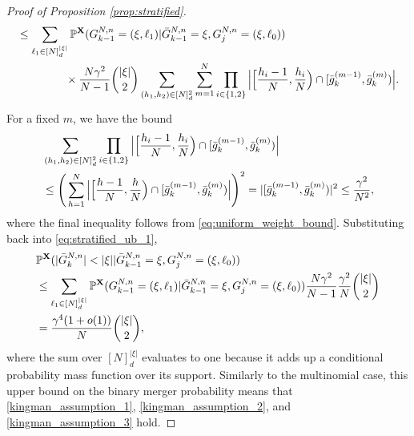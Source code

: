 \documentclass[a4paper,11pt]{article}
\theoremstyle{definition}
\newcommand{\bbP}{\mathbb{P}}
\newcommand{\bfX}{\mathbf{X}}
\begin{document}
\begin{proof}[Proof of Proposition \ref{prop:stratified}]
\begin{align}
&\leq \sum_{ \ell_1 \in [ N ]_d^{ | \xi | } } \bbP^{ \bfX }( G_{ k - 1 }^{ N, n } = ( \xi, \ell_1 ) | \bar{ G }_{ k - 1 }^{ N, n } = \xi, G_j^{ N, n } = ( \xi, \ell_0 ) ) \notag \\
&\phantom{ \leq \sum_{ \ell_1 \in [ N ]_d^{ | \xi | } } } \times \frac{ N \gamma^2 }{ N - 1 } \binom{ | \xi | }{ 2 } \sum_{ ( h_1, h_2 ) \in [ N ]_d^2 } \sum_{ m = 1 }^N \prod_{ i \in \{ 1, 2 \} } \Big| \Big[ \frac{ h_i - 1 }{ N }, \frac{ h_i }{ N } \Big) \cap [ \bar{ g }_k^{ ( m - 1 ) }, \bar{ g }_k^{ ( m ) } ) \Big|. \label{eq:stratified_ub_1}
\end{align}
For a fixed $m$, we have the bound
\begin{align}
&\sum_{ ( h_1, h_2 ) \in [ N ]_d^2 } \prod_{ i \in \{ 1, 2 \} } \Big| \Big[ \frac{ h_i - 1 }{ N }, \frac{ h_i }{ N } \Big) \cap [ \bar{ g }_k^{ ( m - 1 ) }, \bar{ g }_k^{ ( m ) } ) \Big| \notag \\
&\leq \Bigg( \sum_{ h = 1 }^N \Big| \Big[ \frac{ h - 1 }{ N }, \frac{ h }{ N } \Big) \cap [ \bar{ g }_k^{ ( m - 1 ) }, \bar{ g }_k^{ ( m ) } ) \Big| \Bigg)^2 = | [ \bar{ g }_k^{ ( m - 1 ) }, \bar{ g }_k^{ ( m ) } ) |^2 \leq \frac{ \gamma^2 }{ N^2 }, \label{eq:stratified_numerator}
\end{align}
where the final inequality follows from \eqref{eq:uniform_weight_bound}.
Substituting back into \eqref{eq:stratified_ub_1},
\begin{align}
&\bbP^{ \bfX }( | \bar{ G }_k^{ N, n } | < | \xi | | \bar{ G }_{ k - 1 }^{ N, n } = \xi, G_j^{ N, n } = ( \xi, \ell_0 ) ) \notag \\
&\leq \sum_{ \ell_1 \in [ N ]_d^{ | \xi | } } \bbP^{ \bfX }( G_{ k - 1 }^{ N, n } = ( \xi, \ell_1 ) | \bar{ G }_{ k - 1 }^{ N, n } = \xi, G_j^{ N, n } = ( \xi, \ell_0 ) ) \frac{ N \gamma^2 }{ N - 1 } \frac{ \gamma^2 }{ N } \binom{ | \xi | }{ 2 } \notag \\
&= \frac{ \gamma^4 ( 1 + o( 1 ) ) }{ N } \binom{ | \xi | }{ 2 }, \label{eq:stratified_merger_ub}
\end{align}
where the sum over $[ N ]_d^{ | \xi | }$ evaluates to one because it adds up a conditional probability mass function over its support.
Similarly to the multinomial case, this upper bound on the binary merger probability means that \eqref{kingman_assumption_1}, \eqref{kingman_assumption_2}, and \eqref{kingman_assumption_3} hold.


\end{proof}
\end{document}
